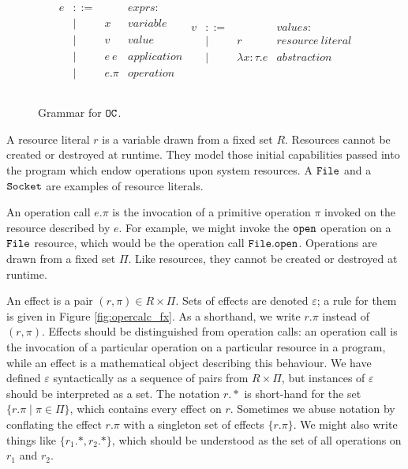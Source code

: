 \begin{figure}[h]
\vspace{-5pt}

\[
\begin{array}{lll}

\begin{array}{lllr}

e & ::= & ~ & exprs: \\
	& | & x & variable \\
	& | & v & value \\
	& | & e ~ e & application \\
	& | & e.\pi & operation \\
	&&\\

\end{array}

\begin{array}{lllr}

v & ::= & ~ & values: \\ 
	& | & r & resource~literal \\
	& | & \lambda x: \tau.e & abstraction \\
	&&\\

\end{array}

\end{array}
\]

\vspace{-7pt}
\caption{Grammar for $\mathtt{OC}$.}
\label{fig:opercalc_grammar}
\end{figure}

A resource literal $r$ is a variable drawn from a fixed set $R$. Resources cannot be created or destroyed at runtime. They model those initial capabilities passed into the program which endow operations upon system resources. A $\mathtt{File}$ and a $\mathtt{Socket}$ are examples of resource literals.

An operation call $e.\pi$ is the invocation of a primitive operation $\pi$ invoked on the resource described by $e$. For example, we might invoke the $\mathtt{open}$ operation on a $\mathtt{File}$ resource, which would be the operation call $\mathtt{File.open}$. Operations are drawn from a fixed set $\Pi$. Like resources, they cannot be created or destroyed at runtime.

An effect is a pair $(r, \pi) \in R \times \Pi$. Sets of effects are denoted $\varepsilon$; a rule for them is given in Figure \ref{fig:opercalc_fx}. 
 As a shorthand, we write $r.\pi$ instead of $(r, \pi)$. Effects should be distinguished from operation calls: an operation call is the invocation of a particular operation on a particular resource in a program, while an effect is a mathematical object describing this behaviour. We have defined $\varepsilon$ syntactically as a sequence of pairs from $R \times \Pi$, but instances of $\varepsilon$ should be interpreted as a set. The notation $r.*$ is short-hand for the set $\{ r.\pi \mid \pi \in \Pi \}$, which contains every effect on $r$. Sometimes we abuse notation by conflating the effect $r.\pi$ with a singleton set of effects $\{ r.\pi \}$. We might also write things like $\{ r_1.*, r_2.* \}$, which should be understood as the set of all operations on $r_1$ and $r_2$.

